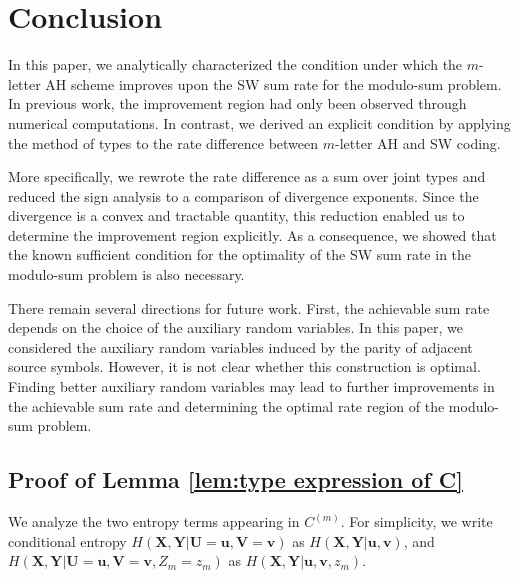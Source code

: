 \documentclass[journal,onecolumn]{IEEEtran}
\theoremstyle{definition}
\theoremstyle{remark}
\newcommand{\um}{\bm{u}}
\newcommand{\vm}{\bm{v}}
\newcommand{\Xm}{\bm{X}}
\newcommand{\Ym}{\bm{Y}}
\newcommand{\Um}{\bm{U}}
\newcommand{\Vm}{\bm{V}}
\begin{document}
\section{Conclusion}
  In this paper, we analytically characterized the condition under which the $m$-letter AH scheme improves upon the SW sum rate for the modulo-sum problem. 
  In previous work, the improvement region had only been observed through numerical computations. 
  In contrast, we derived an explicit condition by applying the method of types to the rate difference between $m$-letter AH and SW coding.
  
  More specifically, we rewrote the rate difference as a sum over joint types and reduced the sign analysis to a comparison of divergence exponents. 
  Since the divergence is a convex and tractable quantity, this reduction enabled us to determine the improvement region explicitly. 
  As a consequence, we showed that the known sufficient condition for the optimality of the SW sum rate in the modulo-sum problem is also necessary.

  There remain several directions for future work. First, the achievable sum rate depends on the choice of the auxiliary random variables. 
  In this paper, we considered the auxiliary random variables induced by the parity of adjacent source symbols. 
  However, it is not clear whether this construction is optimal. 
  Finding better auxiliary random variables may lead to further improvements in the achievable sum rate and determining the optimal rate region of the modulo-sum problem.

\appendix
    \subsection{Proof of Lemma \ref{lem:type expression of C}} \label{prf:type expression of C}
        
    We analyze the two entropy terms appearing in $C^{(m)}$.
    For simplicity, we write conditional entropy $H(\Xm,\Ym|\Um=\um,\Vm=\vm)$ as $H(\Xm,\Ym|\um,\vm)$, and $H(\Xm,\Ym|\Um=\um,\Vm=\vm,Z_m=z_m)$ as $H(\Xm,\Ym|\um,\vm,z_m)$.
    
\end{document}
